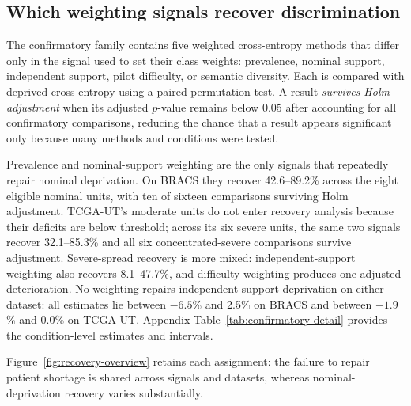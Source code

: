 \documentclass[11pt]{article}
\newcommand{\resultstable}[1]{}
\begin{document}
\subsection{Which weighting signals recover discrimination}
\label{sec:rq2-family}
The confirmatory family contains five weighted cross-entropy methods that differ only in the signal used to set their class weights: prevalence, nominal support, independent support, pilot difficulty, or semantic diversity. Each is compared with deprived cross-entropy using a paired permutation test. A result \emph{survives Holm adjustment} when its adjusted $p$-value remains below \num{0.05} after accounting for all confirmatory comparisons, reducing the chance that a result appears significant only because many methods and conditions were tested.

\begin{table}[ht]
  \centering
  \scriptsize
  \setlength{\tabcolsep}{4pt}
  \resultstable{confirmatory_summary}
  \caption{Balanced-accuracy recovery by shortage and weighting signal. Ranges are percentages of the original deficit; the final column counts results that remain significant after Holm adjustment.}
  \label{tab:confirmatory}
\end{table}

\noindent Prevalence and nominal-support weighting are the only signals that repeatedly repair nominal deprivation. On BRACS they recover \num{42.6}--\num{89.2}\% across the eight eligible nominal units, with ten of sixteen comparisons surviving Holm adjustment. TCGA-UT's moderate units do not enter recovery analysis because their deficits are below threshold; across its six severe units, the same two signals recover \num{32.1}--\num{85.3}\% and all six concentrated-severe comparisons survive adjustment. Severe-spread recovery is more mixed: independent-support weighting also recovers \num{8.1}--\num{47.7}\%, and difficulty weighting produces one adjusted deterioration. No weighting repairs independent-support deprivation on either dataset: all estimates lie between $-\num{6.5}$\% and \num{2.5}\% on BRACS and between $-\num{1.9}$\% and \num{0.0}\% on TCGA-UT. Appendix Table~\ref{tab:confirmatory-detail} provides the condition-level estimates and intervals.

Figure~\ref{fig:recovery-overview} retains each assignment: the failure to repair patient shortage is shared across signals and datasets, whereas nominal-deprivation recovery varies substantially.
\end{document}
